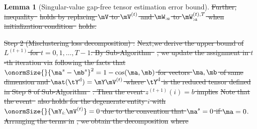 \documentclass[lettersize,onecolumn,journal]{IEEEtran}
\theoremstyle{definition}
\newtheorem{lem}{Lemma}
\theoremstyle{definition}
\newcommand{\of}[1]{\left(#1\right)}
\newcommand{\off}[1]{\left[#1\right]}
\newcommand{\ang}[1]{\left\langle#1\right\rangle}
\providecommand{\DIFdeltex}[1]{{\protect\color{red}\sout{#1}}}                      %
\providecommand{\DIFdelbegin}{} %
\providecommand{\DIFdelend}{} %
\providecommand{\DIFdel}[1]{\texorpdfstring{\DIFdeltex{#1}}{}} %
\newcommand{\DIFscaledelfig}{0.5}
\newlength{\DIFdelgraphicswidth} %
\newlength{\DIFdelgraphicsheight} %
\newcommand{\DIFdelincludegraphics}[2][]{%
\sbox{\DIFdelgraphicsbox}{\DIFOincludegraphics[#1]{#2}}%
\settoboxwidth{\DIFdelgraphicswidth}{\DIFdelgraphicsbox} %
\settoboxtotalheight{\DIFdelgraphicsheight}{\DIFdelgraphicsbox} %
\scalebox{\DIFscaledelfig}{%
\parbox[b]{\DIFdelgraphicswidth}{\usebox{\DIFdelgraphicsbox}\\[-\baselineskip] \rule{\DIFdelgraphicswidth}{0em}}\llap{\resizebox{\DIFdelgraphicswidth}{\DIFdelgraphicsheight}{%
\setlength{\unitlength}{\DIFdelgraphicswidth}%
\begin{picture}(1,1)%
\thicklines\linethickness{2pt} %
{\color[rgb]{1,0,0}\put(0,0){\framebox(1,1){}}}%
{\color[rgb]{1,0,0}\put(0,0){\line( 1,1){1}}}%
{\color[rgb]{1,0,0}\put(0,1){\line(1,-1){1}}}%
\end{picture}%
}\hspace*{3pt}}} %
} %
\DeclareRobustCommand{\DIFdelbegin}{\DIFOdelbegin \let\includegraphics\DIFdelincludegraphics} %
\DeclareRobustCommand{\DIFdelend}{\DIFOaddend \let\includegraphics\DIFOincludegraphics} %
\begin{document}
\begin{lem}[Singular-value gap-free tensor estimation error bound]
\DIFdel{Further, inequality~}%
\DIFdel{holds by replacing $\mV$ to $\mV^{(t)}$ and $\mW_{:a}$ to $\mW_{:a}^{(t),T}$ when initialization condition~}%
\DIFdel{holds.
}%

\DIFdel{Step 2 (Misclustering loss decomposition) :}%
\DIFdel{Next,we derive the upper bound of $L^{(t+1)}$ for $t = 0 ,1, \ldots, T-1$. By Sub-Algorithm~}%
\DIFdel{, we update the assignment in $t$-th iteration via
    }%
\DIFdel{following the facts that $\onormSize{}{\ma^s - \mb^s}^2 = 1 - \cos(\ma, \mb)$ for vectors $\ma,\mb$ of same dimension and $\mat(\tY^\text{d}) = \mY \mV^{(t)}$ where $\tY^\text{d}$ is the reduced tensor defined in Step 8 of Sub-Algorithm~}%
\DIFdel{. Then the event $z^{(t+1)}(i) = b$ implies
    }%
\DIFdel{Note that the event~}%
\DIFdel{also holds for the degenerate entity $i$ with $\onormSize{}{\mY_{i:} \mV^{(t)}} = 0$ due to the convention that $\ma^s = 0$ if $\ma = 0$}\DIFdelend .\DIFdelbegin %
\DIFdel{Arranging the terms in }%
\DIFdel{, we obtain the decomposition
    }%
\DIFdel{where
}
\end{lem}
\end{document}
